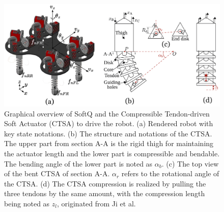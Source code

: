 \begin{figure}[htb]
    \centering
    \includegraphics[width=\linewidth]{img/chap3/robots.pdf}
    \caption{Graphical overview of SoftQ and the Compressible Tendon-driven Soft Actuator (CTSA) to drive the robot. (a) Rendered robot with key state notations. (b) The structure and notations of the CTSA. The upper part from section A-A is the rigid thigh for maintaining the actuator length and the lower part is compressible and bendable. The bending angle of the lower part is noted as $\alpha_b$. (c) The top view of the bent CTSA of section A-A. $\alpha_r$ refers to the rotational angle of the CTSA. (d) The CTSA compression is realized by pulling the three tendons by the same amount, with the compression length being noted as $z_l$, originated from Ji et al.\cite{ji2022Synthesizing, ji2022Omnidirectional}}
    \label{fig:robot}
\end{figure}